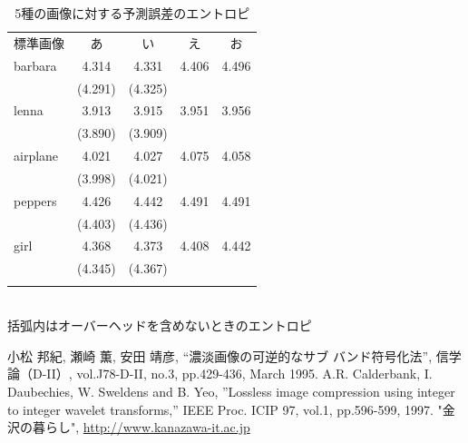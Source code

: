 \documentclass[9pt,dvipdfmx,uplatex]{jsarticle}
\begin{document}
\begin{table}[t]
\begin{center}
\caption{5種の画像に対する予測誤差のエントロピ}\label{TBL_AAA}
\begin{tabular}{lcccc}
\noalign{\hrule height 1pt}
標準画像 & あ & い & え &お\\
\noalign{\hrule height 1pt} 
barbara &4.314&4.331&4.406&4.496\\
        &(4.291)&(4.325)&\\\hline
lenna   &3.913&3.915&3.951&3.956\\
        &(3.890)&(3.909)\\\hline
airplane&4.021&4.027&4.075&4.058\\
        &(3.998)&(4.021)\\\hline
peppers &4.426&4.442&4.491&4.491\\
        &(4.403)&(4.436)\\\hline
girl    &4.368&4.373&4.408&4.442\\
        &(4.345)&(4.367)\\
\noalign{\hrule height 1pt}
\end{tabular}\\
括弧内はオーバーヘッドを含めないときのエントロピ
\end{center}
\end{table}


\begin{thebibliography}{99}
小松 邦紀, 瀬崎 薫, 安田 靖彦, ``濃淡画像の可逆的なサブ
バンド符号化法'', 信学論（D-II）, vol.J78-D-II, no.3,
pp.429-436, March 1995.
A.R. Calderbank, I. Daubechies, W. Sweldens and B. Yeo, ''Lossless
image compression using integer to integer wavelet transforms,'' 
IEEE Proc. ICIP 97, vol.1, pp.596-599, 1997.
 "金沢の暮らし", \url{http://www.kanazawa-it.ac.jp}
\end{thebibliography}
\end{document}
